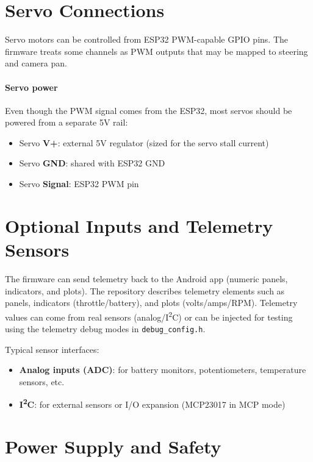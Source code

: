\section{Servo Connections}
\label{sec:hw-servos}

Servo motors can be controlled from ESP32 PWM-capable GPIO pins. The firmware treats some channels as PWM
outputs that may be mapped to steering and camera pan.

\paragraph{Servo power}
Even though the PWM signal comes from the ESP32, most servos should be powered from a separate 5V rail:
\begin{itemize}
    \item Servo \textbf{V+}: external 5V regulator (sized for the servo stall current)
    \item Servo \textbf{GND}: shared with ESP32 GND
    \item Servo \textbf{Signal}: ESP32 PWM pin
\end{itemize}

\section{Optional Inputs and Telemetry Sensors}
\label{sec:hw-telemetry-inputs}

The firmware can send telemetry back to the Android app (numeric panels, indicators, and plots). The repository
describes telemetry elements such as panels, indicators (throttle/battery), and plots (volts/amps/RPM). Telemetry
values can come from real sensors (analog/I\textsuperscript{2}C) or can be injected for testing using the telemetry
debug modes in \texttt{debug\_config.h}.

Typical sensor interfaces:
\begin{itemize}
    \item \textbf{Analog inputs (ADC)}: for battery monitors, potentiometers, temperature sensors, etc.
    \item \textbf{I\textsuperscript{2}C}: for external sensors or I/O expansion (MCP23017 in MCP mode)
\end{itemize}

\section{Power Supply and Safety}
\label{sec:hw-power}


